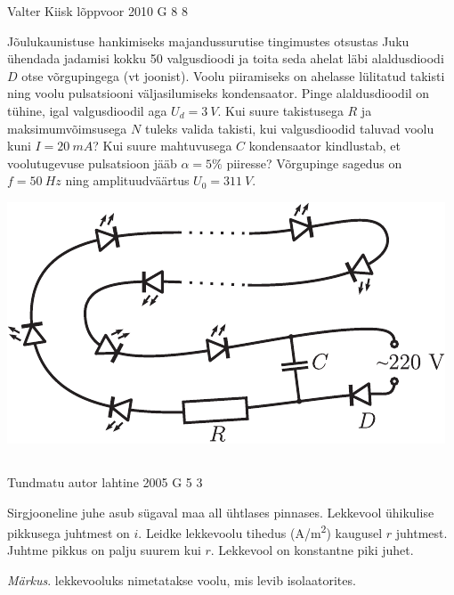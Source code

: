 \documentclass[11pt, twoside]{article}
\begin{document}
{%
{Valter Kiisk} %
{lõppvoor} %
{2010} %
{G 8} %
{8} %
{
\ifStatement
Jõulukaunistuse hankimiseks majandussurutise tingimustes otsustas Juku
ühendada jadamisi kokku 50 valgusdioodi ja toita seda ahelat läbi alaldusdioodi $D$ otse
võrgupingega (vt joonist). Voolu piiramiseks on ahelasse lülitatud takisti
ning voolu pulsatsiooni väljasilumiseks kondensaator. Pinge alaldusdioodil on
tühine, igal valgusdioodil aga $U_d=\SI{3}{V}$. Kui suure takistusega $R$ ja maksimumvõimsusega $N$ tuleks valida
takisti, kui valgusdioodid taluvad voolu kuni $I=\SI{20}{mA}$? Kui suure mahtuvusega $C$
kondensaator kindlustab, et voolutugevuse pulsatsioon jääb $\alpha=\num{5}\%$ piiresse? Võrgupinge
sagedus on $f=\SI{50}{Hz}$ ning amplituudväärtus $U_0=\SI{311}{V}$.

\begin{center}
	\includegraphics[scale=0.75]{2010-v3g-08-elektrikuunlad2}
\end{center}
\fi
}
\newpage\subsection{\protect{}}

{Tundmatu autor} %
{lahtine} %
{2005} %
{G 5} %
{3} %
{
\ifStatement
Sirgjooneline juhe asub sügaval maa all ühtlases pinnases. Lekkevool ühikulise pikkusega juhtmest on $i$. Leidke lekkevoolu tihedus (\si{A/m^2}) kaugusel $r$ juhtmest. Juhtme pikkus on palju suurem kui $r$. Lekkevool on konstantne piki juhet.

\emph{Märkus}. lekkevooluks nimetatakse voolu, mis levib isolaatorites. 
\fi
}

}
\end{document}
